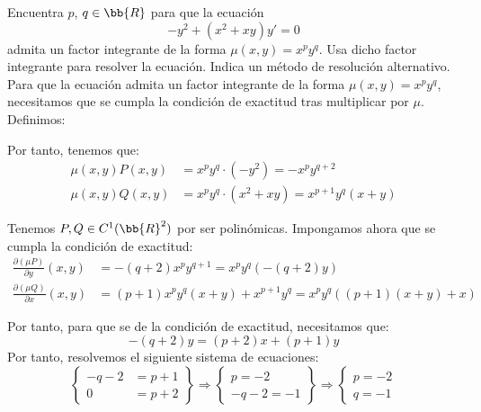 \begin{ejercicio}
    Encuentra $p$, $q \in \bb{R}$ para que la ecuación
    \[
        -y^2 + (x^2 + xy)y' = 0
    \]
    admita un factor integrante de la forma $\mu(x, y) = x^p y^q$. Usa dicho factor integrante para resolver la ecuación. Indica un método de resolución alternativo.\\

    Para que la ecuación admita un factor integrante de la forma $\mu(x, y) = x^p y^q$, necesitamos que se cumpla la condición de exactitud tras multiplicar por $\mu$. Definimos:

    Por tanto, tenemos que:
    \begin{align*}
        \mu(x,y) P(x,y)&=x^p y^q\cdot (-y^2)=-x^p y^{q+2}\\
        \mu(x,y) Q(x,y)&=x^p y^q\cdot (x^2+xy)=x^{p+1}y^q(x+y)
    \end{align*}

    Tenemos $P,Q\in C^1(\bb{R}^2)$ por ser polinómicas. Impongamos ahora que se cumpla la condición de exactitud:
    \begin{align*}
        \frac{\partial (\mu P)}{\partial y}(x,y) &= -(q+2)x^p y^{q+1}=x^py^q(-(q+2)y)\\
        \frac{\partial (\mu Q)}{\partial x}(x,y) &= (p+1)x^py^q(x+y)+x^{p+1}y^q
        = x^py^q((p+1)(x+y)+x)
    \end{align*}

    Por tanto, para que se de la condición de exactitud, necesitamos que:
    \begin{equation*}
        -(q+2)y = (p+2)x + (p+1)y
    \end{equation*}
    Por tanto, resolvemos el siguiente sistema de ecuaciones:
    \begin{equation*}
        \left\{
            \begin{aligned}
                -q-2 &= p+1\\
                0 &= p+2
            \end{aligned}
        \right\}
        \Longrightarrow
        \left\{
            \begin{aligned}
                p=-2\\
                -q-2=-1
            \end{aligned}
        \right\}
        \Longrightarrow
        \left\{
            \begin{aligned}
                p=-2\\
                q=-1
            \end{aligned}
        \right.
    \end{equation*}


\end{ejercicio}
